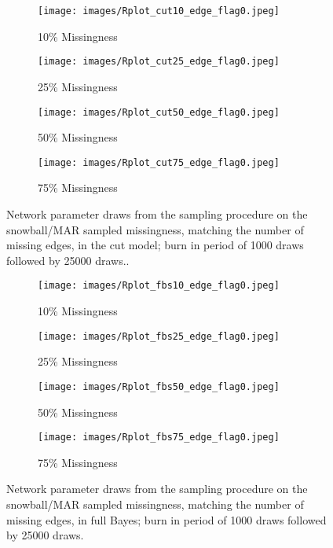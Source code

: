 \documentclass{article}
\begin{document}
\begin{figure}[h]
	\begin{subfigure}[b]{0.5\linewidth}
		\centering
		\texttt{[image: images/Rplot\_cut10\_edge\_flag0.jpeg]}
		\caption{10\% Missingness}
		\vspace{4ex}
	\end{subfigure}%
	\begin{subfigure}[b]{0.5\linewidth}
		\centering
		\texttt{[image: images/Rplot\_cut25\_edge\_flag0.jpeg]}
		\caption{25\% Missingness}
		\vspace{4ex}
	\end{subfigure}
	\begin{subfigure}[b]{0.5\linewidth}
		\centering
		\texttt{[image: images/Rplot\_cut50\_edge\_flag0.jpeg]}
		\caption{50\% Missingness}
	\end{subfigure}
	\begin{subfigure}[b]{0.5\linewidth}
		\centering
		\texttt{[image: images/Rplot\_cut75\_edge\_flag0.jpeg]}
		\caption{75\% Missingness}
\end{subfigure}
	\caption{Network parameter draws from the sampling procedure on the snowball/MAR sampled missingness, matching the number of missing edges, in the cut model; burn in period of 1000 draws followed by 25000 draws..}
	\label{fig:rhoestimatesCUTsnowF2}
\end{figure}

\begin{figure}[h]
	\begin{subfigure}[b]{0.5\linewidth}
		\centering
		\texttt{[image: images/Rplot\_fbs10\_edge\_flag0.jpeg]}
		\caption{10\% Missingness}
	\end{subfigure}
	\begin{subfigure}[b]{0.5\linewidth}
		\centering
		\texttt{[image: images/Rplot\_fbs25\_edge\_flag0.jpeg]}
		\caption{25\% Missingness}
	\end{subfigure}
	\begin{subfigure}[b]{0.5\linewidth}
		\centering
		\texttt{[image: images/Rplot\_fbs50\_edge\_flag0.jpeg]}
		\caption{50\% Missingness}
	\end{subfigure}
	\begin{subfigure}[b]{0.5\linewidth}
		\centering
		\texttt{[image: images/Rplot\_fbs75\_edge\_flag0.jpeg]}
		\caption{75\% Missingness}
	\end{subfigure}
	\caption{Network parameter draws from the sampling procedure on the snowball/MAR sampled missingness, matching the number of missing edges, in full Bayes; burn in period of 1000 draws followed by 25000 draws.}
	\label{fig:rhoestimatesFBMsnowF2}
\end{figure}
\end{document}
